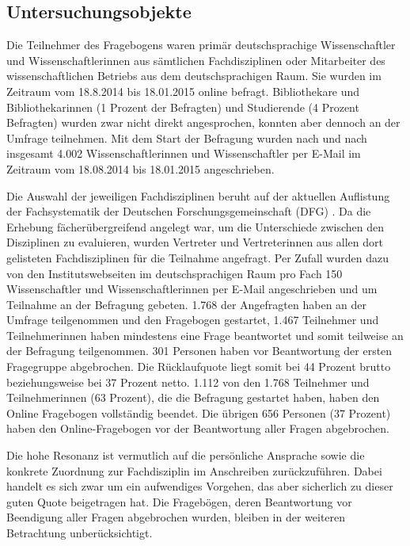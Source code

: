 \subsection{Untersuchungsobjekte}

Die Teilnehmer des Fragebogens waren primär deutschsprachige Wissenschaftler und Wissenschaftlerinnen aus sämtlichen Fachdisziplinen oder Mitarbeiter des wissenschaftlichen Betriebs aus dem deutschsprachigen Raum. Sie wurden im Zeitraum vom 18.8.2014 bis 18.01.2015 online befragt. Bibliothekare und Bibliothekarinnen (1 Prozent der Befragten) und Studierende (4 Prozent Befragten) wurden zwar nicht direkt angesprochen, konnten aber dennoch an der Umfrage teilnehmen. Mit dem Start der Befragung wurden nach und nach insgesamt 4.002 Wissenschaftlerinnen und Wissenschaftler per E-Mail im Zeitraum vom 18.08.2014 bis 18.01.2015 angeschrieben.

Die Auswahl der jeweiligen Fachdisziplinen beruht auf der aktuellen Auflistung der Fachsystematik der Deutschen Forschungsgemeinschaft (DFG) \cite{suchen_Webseite_DFG}. Da die Erhebung fächerübergreifend angelegt war, um die Unterschiede zwischen den Disziplinen zu evaluieren, wurden Vertreter und Vertreterinnen aus allen dort gelisteten Fachdisziplinen für die Teilnahme angefragt. Per Zufall wurden dazu von den Institutswebseiten im deutschsprachigen Raum pro Fach 150 Wissenschaftler und Wissenschaftlerinnen per E-Mail angeschrieben und um Teilnahme an der Befragung gebeten. 1.768 der Angefragten haben an der Umfrage teilgenommen und den Fragebogen gestartet, 1.467 Teilnehmer und Teilnehmerinnen haben mindestens eine Frage beantwortet und somit teilweise an der Befragung teilgenommen. 301 Personen haben vor Beantwortung der ersten Fragegruppe abgebrochen. Die Rücklaufquote liegt somit bei 44 Prozent brutto beziehungsweise bei 37 Prozent netto. 1.112 von den 1.768 Teilnehmer und Teilnehmerinnen (63 Prozent), die die Befragung gestartet haben, haben den Online Fragebogen vollständig beendet. Die übrigen 656 Personen (37 Prozent) haben den Online-Fragebogen vor der Beantwortung aller Fragen abgebrochen.

Die hohe Resonanz ist vermutlich auf die persönliche Ansprache sowie die konkrete Zuordnung zur Fachdisziplin im Anschreiben zurückzuführen. Dabei handelt es sich zwar um ein aufwendiges Vorgehen, das aber sicherlich zu dieser guten Quote beigetragen hat. Die Fragebögen, deren Beantwortung vor Beendigung aller Fragen abgebrochen wurden, bleiben in der weiteren Betrachtung unberücksichtigt.

